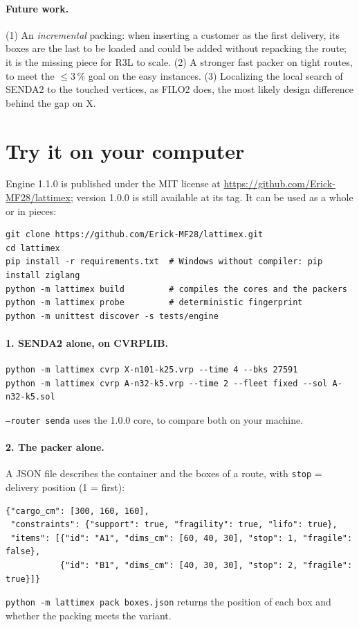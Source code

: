 \documentclass[11pt,a4paper]{article}
\newcommand{\sendados}{SENDA2}
\newcommand{\tsl}[1]{\texttt{\small #1}}
\begin{document}
\paragraph{Future work.} (1) An \emph{incremental} packing: when inserting a customer as the first
delivery, its boxes are the last to be loaded and could be added without repacking the route; it is the
missing piece for R3L to scale. (2) A stronger fast packer on tight routes, to meet the $\le 3\,\%$ goal
on the easy instances. (3) Localizing the local search of \sendados{} to the touched vertices, as FILO2
does, the most likely design difference behind the gap on X.

\section{Try it on your computer}
\label{sec:pruebalo}

Engine 1.1.0 is published under the MIT license at \url{https://github.com/Erick-MF28/lattimex}; version
1.0.0 is still available at its tag. It can be used as a whole or in pieces:

\begin{verbatim}
git clone https://github.com/Erick-MF28/lattimex.git
cd lattimex
pip install -r requirements.txt  # Windows without compiler: pip install ziglang
python -m lattimex build         # compiles the cores and the packers
python -m lattimex probe         # deterministic fingerprint
python -m unittest discover -s tests/engine
\end{verbatim}

\paragraph{1. \sendados{} alone, on CVRPLIB.}
\begin{verbatim}
python -m lattimex cvrp X-n101-k25.vrp --time 4 --bks 27591
python -m lattimex cvrp A-n32-k5.vrp --time 2 --fleet fixed --sol A-n32-k5.sol
\end{verbatim}
\tsl{--router senda} uses the 1.0.0 core, to compare both on your machine.

\paragraph{2. The packer alone.} A JSON file describes the container and the boxes of a route, with
\tsl{stop} = delivery position (1 = first):
\begin{verbatim}
{"cargo_cm": [300, 160, 160],
 "constraints": {"support": true, "fragility": true, "lifo": true},
 "items": [{"id": "A1", "dims_cm": [60, 40, 30], "stop": 1, "fragile": false},
           {"id": "B1", "dims_cm": [40, 30, 30], "stop": 2, "fragile": true}]}
\end{verbatim}
\tsl{python -m lattimex pack boxes.json} returns the position of each box and whether the packing meets
the variant.
\end{document}
